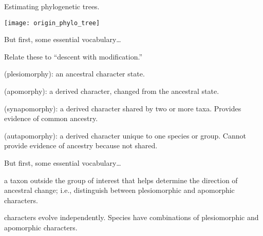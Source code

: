 \documentclass[t,handout]{beamer}  %
\begin{document}

\begin{frame}[t]{Estimating phylogenetic trees.}
	
\texttt{[image: origin\_phylo\_tree]}	
\end{frame}

\begin{frame}[t]{But first, some essential vocabulary\dots}

Relate these to “descent with modification.”

\hangpara {} (plesiomorphy): an ancestral character state.

\hangpara {} (apomorphy): a derived character, changed from the ancestral state.

\hangpara {} (synapomorphy): a derived character shared by two or more taxa. Provides evidence of common ancestry.

\hangpara {} (autapomorphy): a derived character unique to one species or group. Cannot provide evidence of ancestry because not shared.

\end{frame}

\begin{frame}[t]{But first, some essential vocabulary\dots}

\hangpara {} a taxon outside the group of interest that helps determine the direction of ancestral change; i.e., distinguish between plesiomorphic and apomorphic characters.

\hangpara {} characters evolve independently. Species have combinations of plesiomorphic and apomorphic characters.

\end{frame}
\end{document}
